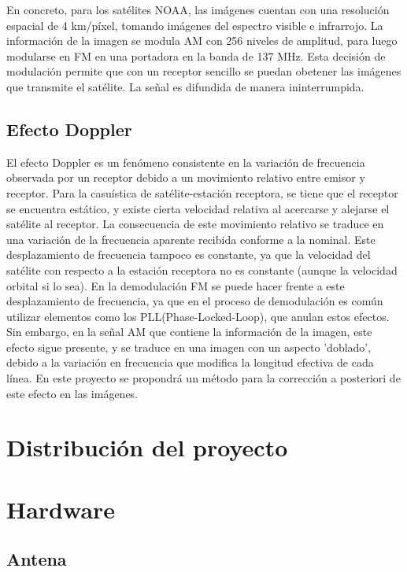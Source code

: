 \documentclass[a4paper,openright,12pt]{article}
\begin{document}
	En concreto, para los satélites NOAA, las imágenes cuentan con una resolución espacial de 4 km/píxel, tomando imágenes del espectro visible e infrarrojo. La información de la imagen se modula AM con 256 niveles de amplitud, para luego modularse en FM en una portadora en la banda de 137 MHz. Esta decisión de modulación permite que con un receptor sencillo se puedan obetener las imágenes que transmite el satélite. La señal es difundida de manera ininterrumpida.
	
	
	
	\subsection{Efecto Doppler}

	El efecto Doppler es un fenómeno consistente en la variación de frecuencia observada por un receptor debido a un movimiento relativo entre emisor y receptor. Para la casuística de satélite-estación receptora, se tiene que el receptor se encuentra estático, y existe cierta velocidad relativa al acercarse y alejarse el satélite al receptor. La consecuencia de este movimiento relativo se traduce en una variación de la frecuencia aparente recibida conforme a la nominal. Este desplazamiento de frecuencia tampoco es constante, ya que la velocidad del satélite con respecto a la estación receptora  no es constante (aunque la velocidad orbital si lo sea). En la demodulación FM se puede hacer frente a este desplazamiento de frecuencia, ya que en el proceso de demodulación es común utilizar elementos como los PLL(Phase-Locked-Loop), que anulan estos efectos. Sin embargo, en la señal AM que contiene la información de la imagen, este efecto sigue presente, y se traduce en una imagen con un aspecto 'doblado', debido a la variación en frecuencia que modifica la longitud efectiva de cada línea. En este proyecto se propondrá un método para la corrección a posteriori de este efecto en las imágenes.

\section{Distribución del proyecto}


\section{Hardware}

	\subsection{Antena}
\end{document}
